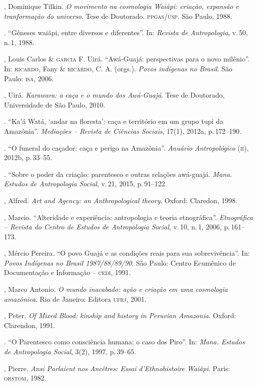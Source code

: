 \begin{bibliohedra}
, Dominique Tilkin. \emph{O movimento na cosmologia Waiãpi: criação, expansão
e tranformação do universo}. Tese de Doutorado. \textsc{ppgas}/\textsc{usp}. São Paulo, 1988.

\titidem. ``Gêneses waiãpi, entre diversos e diferentes''. In:
\emph{Revista de Antropologia}, v.\,50, n.\,1, 1988.

, Louis Carlos \& \textsc{garcia} F. Uirá. ``Awá-Guajá: perspectivas para o novo milênio''. In: \textsc{ricardo}, Fany \& \textsc{ricardo}, C. A. (orgs.). \emph{Povos indígenas no Brasil}. São Paulo: \textsc{isa}, 2006.

, Uirá. \emph{Karawara: a caça e o mundo dos Awá-Guajá}. Tese de
Doutorado, Universidade de São Paulo, 2010.

\titidem. ``Ka'á Watá, `andar na floresta': caça e território em
um grupo tupi da Amazônia''. \emph{Mediações -- Revista de Ciências
Sociais}, 17(1), 2012a, p.\,172--190.

\titidem. ``O funeral do caçador: caça e perigo na Amazônia''.
\emph{Anuário Antropológico} (\textsc{ii}), 2012b, p.\,33--55.

\titidem. ``Sobre o poder da criação: parentesco e outras relações
awá-guajá. \emph{Mana. Estudos de Antropologia Social}, v.\,21, 2015, p.\,91--122.

, Alfred. \emph{Art and Agency: an Anthropological theory}. Oxford:
Claredon, 1998.

, Marcio. ``Alteridade e experiência: antropologia e teoria
etnográfica''. \emph{Etnográfica -- Revista do Centro de Estudos de
Antropologia Social}, v.\,10, n.\,1, 2006, p.\,161--173.

, Mércio Pereira. ``O povo Guajá e as condições reais para sua
sobrevivência''. In: \emph{Povos Indígenas no Brasil 1987/88/89/90}. São
Paulo: Centro Ecumênico de Documentação e Informação -- \textsc{cedi}, 1991.

, Marco Antonio. \emph{O mundo inacabado: ação e criação em uma cosmologia
amazônica}. Rio de Janeiro: Editora \textsc{ufrj}, 2001.

, Peter. \emph{Of Mixed Blood: kinship and history in Peruvian
Amazonia}. Oxford: Clarendon, 1991.

\titidem. ``O Parentesco como consciência humana: o caso dos Piro''.
In: \emph{Mana. Estudos de Antropologia Social}, 3(2), 1997, p.\,39--65.

, Pierre. \emph{Ansi Parlaient nos Ancêtres: Essai d'Ethnohistoire
Waiãpi}. Paris: \textsc{orstom}, 1982.


\end{bibliohedra}
